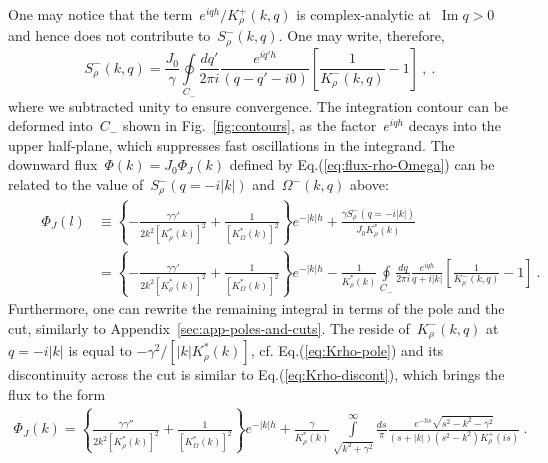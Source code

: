 \documentclass[preprint,aps,eqsecnum, prb]{revtex4-1}
\newcommand{\fplus}[1]{{#1}^{+}}
\newcommand{\fminus}[1]{{#1}^{-}}
\renewcommand{\Im}{\mathop{\mathrm{Im}}\nolimits}
\begin{document}
One may notice that the term~$e^{iqh} / \fplus{K}_\rho(k, q)$
is complex-analytic at~$\Im q > 0$ and hence does not contribute
to~$\fminus{S}_\rho(k, q)$. One may write, therefore, 
\begin{equation}
  \label{eq:bulk-chi-cauchy}
  \fminus{S}_\rho(k, q) = \frac{J_0}{\gamma} \oint\limits_{C_{-}}
  \frac{dq'}{2\pi i} \frac{e^{iq'h}}{(q - q' - i0)}
  \left[\frac{1}{\fminus{K}_\rho(k, q)} - 1\right]\ , 
  \ .
\end{equation}
where we subtracted unity to ensure convergence. The integration 
contour can be deformed into~$C_{-}$ shown in Fig.~\ref{fig:contours}, 
as the factor~$e^{iqh}$ decays into the upper half-plane, which suppresses
fast oscillations in the integrand. 
The downward flux~$\Phi(k) = J_0 \Phi_J(k)$ 
defined by Eq.(\ref{eq:flux-rho-Omega}) can be related
to the value of~$\fminus{S}_\rho(q = -i|k|)$ and~$\fminus{\Omega}(k, q)$
above:
\begin{align}
  \label{eq:phi-j-prev} 
\qquad \Phi_J(l) &\equiv
\left\{- \frac{\gamma \gamma'}{2k^2 \left[K_\rho^\ast(k)\right]^2}
+ \frac{1}{\left[K_\Omega^\ast(k)\right]^2} \right\} e^{-|k|h}
+ \frac{\gamma \fminus{S}_\rho(q=-i|k|)}{J_0 K_\rho^\ast(k)}
\\ \nonumber
&=\left\{- \frac{\gamma \gamma'}{2k^2 \left[K_\rho^\ast(k)\right]^2}
+ \frac{1}{\left[K_\Omega^\ast(k)\right]^2} \right\} e^{-|k|h}
- \frac{1}{K_\rho^\ast(k)} \oint\limits_{C_{-}} \frac{dq}{2\pi i} 
\frac{e^{iqh}}{q + i |k|}
\left[\frac{1}{\fminus{K}_\rho(k, q)} - 1\right]
\ .
\end{align}
Furthermore, one can rewrite the remaining integral in terms of 
the pole and the cut, similarly to Appendix~\ref{sec:app-poles-and-cuts}.
The reside of~$\fminus{K}_\rho(k, q)$ at~$q = -i|k|$ is equal to 
$-\gamma^2 / \left[|k| K_\rho^\ast(k)\right]$, cf. Eq.(\ref{eq:Krho-pole})
and its discontinuity across the cut is similar to Eq.(\ref{eq:Krho-discont}), 
which brings the flux to the form
\begin{align}
\Phi_J(k) = \left\{\frac{\gamma \gamma''}{2k^2 \left[K_\rho^\ast(k)\right]^2}
+ \frac{1}{\left[K_\Omega^\ast(k)\right]^2} \right\} e^{-|k|h}
+ \frac{\gamma}{K_\rho^\ast(k)}
   \int\limits_{\sqrt{k^2 + \gamma^2}}^{\infty} \frac{ds}{\pi}
   \frac{e^{-hs} \sqrt{s^2 - k^2 - \gamma^2}}{(s + |k|) (s^2 - k^2) \fplus{K}_\rho(is)}
\ . 
\end{align}
\end{document}

